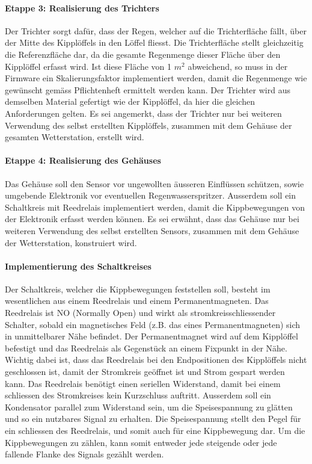 \paragraph{Etappe 3: Realisierung des Trichters}
Der Trichter sorgt dafür, dass der Regen, welcher auf die Trichterfläche fällt, über der Mitte des Kipplöffels in den Löffel fliesst. Die Trichterfläche stellt gleichzeitig die Referenzfläche dar, da die gesamte Regenmenge dieser Fläche über den Kipplöffel erfasst wird. Ist diese Fläche von 1 $m^2$ abweichend, so muss in der Firmware ein Skalierungsfaktor implementiert werden, damit die Regenmenge wie gewünscht gemäss Pflichtenheft ermittelt werden kann. Der Trichter wird aus demselben Material gefertigt wie der Kipplöffel, da hier die gleichen Anforderungen gelten. Es sei angemerkt, dass der Trichter nur bei weiteren Verwendung des selbst erstellten Kipplöffels, zusammen mit dem Gehäuse der gesamten Wetterstation, erstellt wird.

\paragraph{Etappe 4: Realisierung des Gehäuses}
Das Gehäuse soll den Sensor vor ungewollten äusseren Einflüssen schützen, sowie umgebende Elektronik vor eventuellen Regenwasserspritzer. Ausserdem soll ein Schaltkreis mit Reedrelais implementiert werden, damit die Kippbewegungen von der Elektronik erfasst werden können. Es sei erwähnt, dass das Gehäuse nur bei weiteren Verwendung des selbst erstellten Sensors, zusammen mit dem Gehäuse der Wetterstation, konstruiert wird.

\paragraph{Implementierung des Schaltkreises}
Der Schaltkreis, welcher die Kippbewegungen feststellen soll, besteht im wesentlichen aus einem Reedrelais und einem Permanentmagneten. Das Reedrelais ist NO (Normally Open) und wirkt als stromkreisschliessender Schalter, sobald ein magnetisches Feld (z.B. das eines Permanentmagneten) sich in unmittelbarer Nähe befindet. Der Permanentmagnet wird auf dem Kipplöffel befestigt und das Reedrelais als Gegenstück an einem Fixpunkt in der Nähe. Wichtig dabei ist, dass das Reedrelais bei den Endpositionen des Kipplöffels nicht geschlossen ist, damit der Stromkreis geöffnet ist und Strom gespart werden kann. Das Reedrelais benötigt einen seriellen Widerstand, damit bei einem schliessen des Stromkreises kein Kurzschluss auftritt. Ausserdem soll ein Kondensator parallel zum Widerstand sein, um die Speisespannung zu glätten und so ein nutzbares Signal zu erhalten. Die Speisespannung stellt den Pegel für ein schliessen des Reedrelais, und somit auch für eine Kippbewegung dar. Um die Kippbewegungen zu zählen, kann somit entweder jede steigende oder jede fallende Flanke des Signals gezählt werden.  

